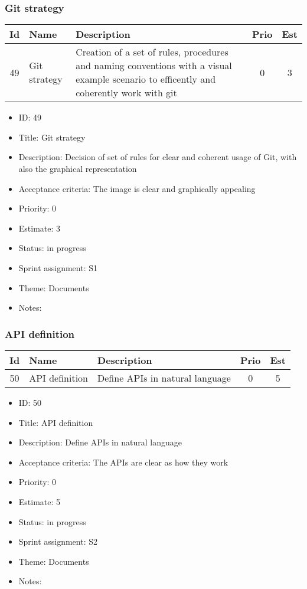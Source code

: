 \newpage
\subsubsection{Git strategy}
\begin{tabular}{|c|m{1.5cm}|m{4cm}|c|c|}
	\hline
	\textbf{Id}&\textbf{Name}&\textbf{Description}&\textbf{Prio}&\textbf{Est}\\
	\hline
	49 & Git strategy & 
	Creation of a set of rules, procedures and naming conventions with a visual example scenario to efficently and coherently work with git &
	0 & 3 \\
	\hline
\end{tabular}
\begin{itemize}
	\item ID: 49
	\item Title: Git strategy
	\item Description: Decision of set of rules for clear and coherent usage of Git, with also the graphical representation
	\item Acceptance criteria: The image is clear and graphically appealing
	\item Priority: 0
	\item Estimate: 3
	\item Status: in progress
	\item Sprint assignment: S1
	\item Theme: Documents
	\item Notes:
\end{itemize}

\newpage
\subsubsection{API definition}
\begin{tabular}{|c|m{1.5cm}|m{4cm}|c|c|}
	\hline
	\textbf{Id}&\textbf{Name}&\textbf{Description}&\textbf{Prio}&\textbf{Est}\\
	\hline
	50 & API definition & 
	Define APIs in natural language &
	0 & 5 \\
	\hline
\end{tabular}
\begin{itemize}
	\item ID: 50
	\item Title: API definition
	\item Description: Define APIs in natural language
	\item Acceptance criteria: The APIs are clear as how they work
	\item Priority: 0
	\item Estimate: 5
	\item Status: in progress
	\item Sprint assignment: S2
	\item Theme: Documents
	\item Notes:
\end{itemize}

